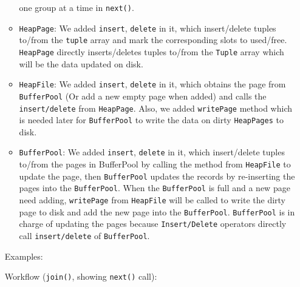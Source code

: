 \documentclass[10pt]{myland}
\begin{document}
\begin{enumerate}[label=\textbf{\arabic*.}, listparindent=0.0em, itemsep=1em]
\begin{itemize}
            one group at a time in \texttt{next()}.
		\item \texttt{HeapPage}: We added \texttt{insert}, \texttt{delete} in it, which insert/delete tuples to/from the
            \texttt{tuple} array and mark the corresponding slots to used/free. \texttt{HeapPage} directly inserts/deletes
            tuples to/from the \texttt{Tuple} array which will be the data updated on disk.
        \item \texttt{HeapFile}: We added \texttt{insert}, \texttt{delete} in it, which obtains the page from
            \texttt{BufferPool} (Or add a new empty page when added) and calls the \texttt{insert/delete} from
            \texttt{HeapPage}. Also, we added \texttt{writePage} method which is needed later for \texttt{BufferPool}
            to write the data on dirty \texttt{HeapPages} to disk.
		\item \texttt{BufferPool}: We added \texttt{insert}, \texttt{delete} in it, which insert/delete tuples to/from the
            pages in BufferPool by calling the method from \texttt{HeapFile} to update the page, then \texttt{BufferPool}
            updates the records by re-inserting the pages into the \texttt{BufferPool}. When the \texttt{BufferPool} is
            full and a new page need adding, \texttt{writePage} from \texttt{HeapFile} will be called to write the dirty
            page to disk and add the new page into the \texttt{BufferPool}. \texttt{BufferPool} is in charge of updating
            the pages because \texttt{Insert/Delete} operators directly call \texttt{insert/delete} of \texttt{BufferPool}.
	\end{itemize}
    \newpage
    \par Examples:
    \par Workflow (\texttt{join()}, showing \texttt{next()} call): \\
    \begin{center}
\end{center}
\end{enumerate}
\end{document}
